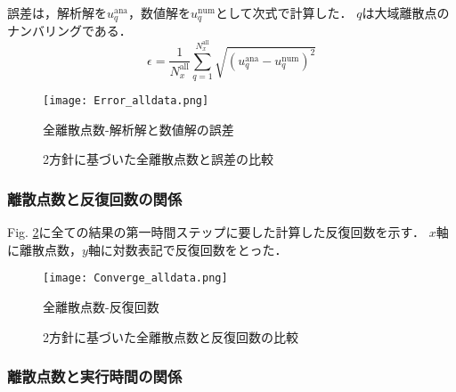 \documentclass[12pt,a4paper]{jsarticle}
\begin{document}
誤差は，解析解を$u_{q}^\text{ana}$，数値解を$u_{q}^\text{num}$として次式で計算した．
$q$は大域離散点のナンバリングである．
\begin{equation}
  \epsilon = \frac{1}{N_{x}^\text{all}} \sum_{q=1}^{N_{x}^\text{all}} \sqrt{( u_{q}^\text{ana}-u_{q}^\text{num} )^2}
\end{equation}
\begin{figure}[h]
  \centering
  \texttt{[image: Error\_alldata.png]}
  \caption{全離散点数-解析解と数値解の誤差}
  \label{fig:Error_alldata}
\end{figure}
\begin{figure}[h]
    \caption{2方針に基づいた全離散点数と誤差の比較}
\end{figure}


\subsubsection{離散点数と反復回数の関係}
\label{subsubsec:TotalInterpolant_Converge}

Fig. \ref{fig:Converge_alldata}に全ての結果の第一時間ステップに要した計算した反復回数を示す．
$x$軸に離散点数，$y$軸に対数表記で反復回数をとった．
\begin{figure}[h]
  \centering
  \texttt{[image: Converge\_alldata.png]}
  \caption{全離散点数-反復回数}
  \label{fig:Converge_alldata}
\end{figure}
\begin{figure}[h]
  \centering
    \caption{2方針に基づいた全離散点数と反復回数の比較}
\end{figure}

\subsubsection{離散点数と実行時間の関係}
\label{subsubsec:TotalInterpolant_ExecutionTime}
\end{document}
